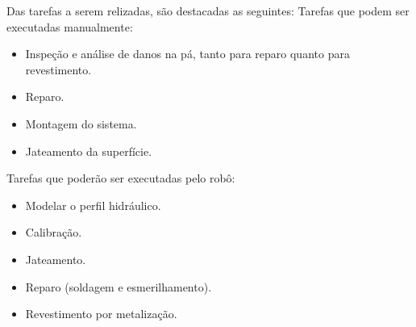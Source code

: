 Das tarefas a serem relizadas, são destacadas as seguintes:
Tarefas que podem ser executadas manualmente:
\begin{itemize}
  \item Inspeção e análise de danos na pá, tanto para reparo quanto para
  revestimento.
  \item Reparo.
  \item Montagem do sistema.
  \item Jateamento da superfície.
\end{itemize}

Tarefas que poderão ser executadas pelo robô:
\begin{itemize}
  \item Modelar o perfil hidráulico.
  \item Calibração.
  \item Jateamento.
  \item Reparo (soldagem e esmerilhamento).
  \item Revestimento por metalização.
\end{itemize}
